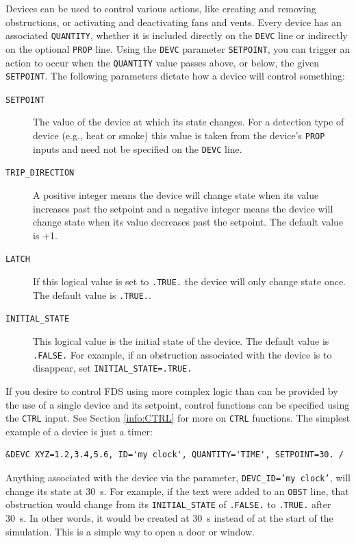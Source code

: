 \documentclass[11pt]{book}
\newcommand{\ct}{\tt\small}
\begin{document}
Devices can be used to control various actions, like creating and removing obstructions, or activating and deactivating
fans and vents. Every device has an associated {\ct QUANTITY}, whether it is included directly on the {\ct DEVC} line or
indirectly on the optional {\ct PROP} line. Using the {\ct DEVC} parameter {\ct SETPOINT}, you can trigger an action to
occur when the {\ct QUANTITY} value passes above, or below, the given {\ct SETPOINT}.
The following parameters dictate how a device will control something:
\begin{description}
\item[{\ct SETPOINT}] The value of the device at which its state changes.  For a detection type of device
(e.g., heat or smoke) this value is taken from the device's {\ct PROP} inputs and need not be specified on the {\ct DEVC} line.
\item[{\ct TRIP\_DIRECTION}] A positive integer means the device will change state when its value increases
past the setpoint and a negative integer means the device will change state
when its value decreases past the setpoint.  The default value is +1.
\item[{\ct LATCH}] If this logical value is set to {\ct .TRUE.} the device will only change state once.
The default value is {\ct .TRUE.}.
\item[{\ct INITIAL\_STATE}] This logical value is the initial state of the device. The default value
is {\ct .FALSE.} For example, if an obstruction associated with the device is to disappear, set {\ct INITIAL\_STATE=.TRUE.}
\end{description}
If you desire to control FDS using more complex logic than can be provided
by the use of a single device and its setpoint, control functions can be specified using the {\ct CTRL} input.
See Section \ref{info:CTRL} for more on {\ct CTRL} functions.
The simplest example of a device is just a timer:

\footnotesize
\begin{verbatim}
&DEVC XYZ=1.2,3.4,5.6, ID='my clock', QUANTITY='TIME', SETPOINT=30. /
\end{verbatim}
\normalsize

\noindent
Anything associated with the device via the parameter, {\ct DEVC\_ID='my clock'}, will change its state at 30~s. For example,
if the text were added to an {\ct OBST} line, that obstruction would change from its {\ct INITIAL\_STATE} of {\ct .FALSE.} to {\ct .TRUE.} after
30~s. In other words, it would be created at 30~s instead of at the start of the simulation. This is a simple way to open a door or window.
\end{document}
